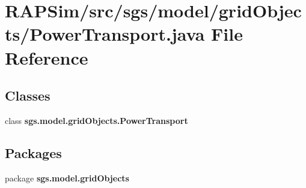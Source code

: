 \section{R\-A\-P\-Sim/src/sgs/model/grid\-Objects/\-Power\-Transport.java File Reference}
\label{_power_transport_8java}
\subsection*{Classes}
\begin{DoxyCompactItemize}
\item 
class {\bf sgs.\-model.\-grid\-Objects.\-Power\-Transport}
\end{DoxyCompactItemize}
\subsection*{Packages}
\begin{DoxyCompactItemize}
\item 
package {\bf sgs.\-model.\-grid\-Objects}
\end{DoxyCompactItemize}
